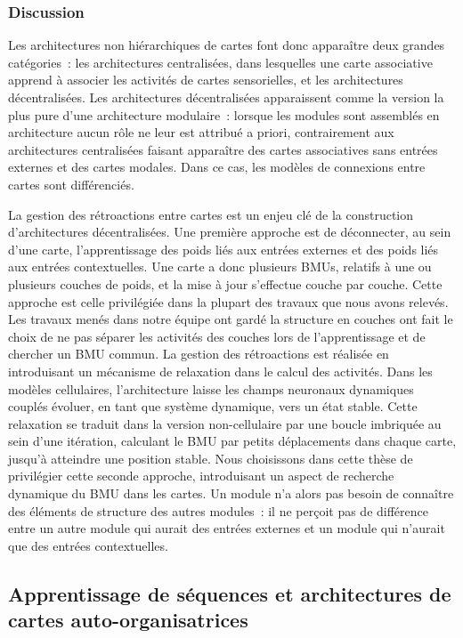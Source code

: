 \documentclass[../main]{subfiles}
\begin{document}
\subsubsection{Discussion}

Les architectures non hiérarchiques de cartes font donc apparaître deux grandes catégories~: les architectures centralisées, dans lesquelles une carte associative apprend à associer les activités de cartes sensorielles, et les architectures décentralisées.
Les architectures décentralisées apparaissent comme la version la plus pure d'une architecture modulaire~: lorsque les modules sont assemblés en architecture aucun rôle ne leur est attribué a priori, contrairement aux architectures centralisées faisant apparaître des cartes associatives sans entrées externes et des cartes modales. Dans ce cas, les modèles de connexions entre cartes sont différenciés.

La gestion des rétroactions entre cartes est un enjeu clé de la construction d'architectures décentralisées. Une première approche est de déconnecter, au sein d'une carte, l'apprentissage des poids liés aux entrées externes et des poids liés aux entrées contextuelles. Une carte a donc plusieurs BMUs, relatifs à une ou plusieurs couches de poids, et la mise à jour s'effectue couche par couche. Cette approche est celle privilégiée dans la plupart des travaux que nous avons relevés.
Les travaux menés dans notre équipe ont gardé la structure en couches ont fait le choix de ne pas séparer les activités des couches lors de l'apprentissage et de chercher un BMU commun.
La gestion des rétroactions est réalisée en introduisant un mécanisme de relaxation dans le calcul des activités. Dans les modèles cellulaires, l'architecture laisse les champs neuronaux dynamiques couplés évoluer, en tant que système dynamique, vers un état stable. Cette relaxation se traduit dans la version non-cellulaire par une boucle imbriquée au sein d'une itération, calculant le BMU par petits déplacements dans chaque carte, jusqu'à atteindre une position stable.
Nous choisissons dans cette thèse de privilégier cette seconde approche, introduisant un aspect de recherche dynamique du BMU dans les cartes. Un module n'a alors pas besoin de connaître des éléments de structure des autres modules~: il ne perçoit pas de différence entre un autre module qui aurait des entrées externes et un module qui n'aurait que des entrées  contextuelles.


\subsection{Apprentissage de séquences et architectures de cartes auto-organisatrices}
\end{document}
